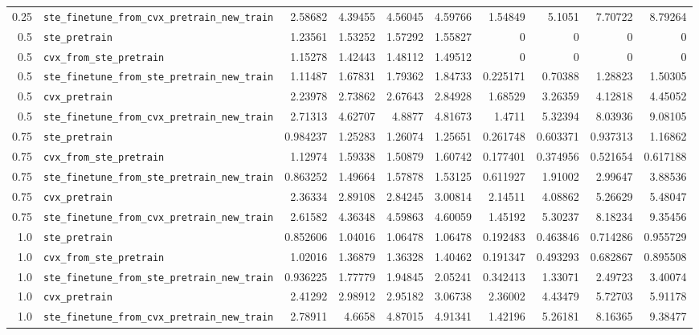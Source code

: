 \begin{longtable}{@{}r l *{8}{r}@{}}
0.25 & \texttt{ste\_finetune\_from\_cvx\_pretrain\_new\_train} & 2.58682 & 4.39455 & 4.56045 & 4.59766 & 1.54849 & 5.1051 & 7.70722 & 8.79264 \\
0.5 & \texttt{ste\_pretrain} & 1.23561 & 1.53252 & 1.57292 & 1.55827 & 0 & 0 & 0 & 0 \\
0.5 & \texttt{cvx\_from\_ste\_pretrain} & 1.15278 & 1.42443 & 1.48112 & 1.49512 & 0 & 0 & 0 & 0 \\
0.5 & \texttt{ste\_finetune\_from\_ste\_pretrain\_new\_train} & 1.11487 & 1.67831 & 1.79362 & 1.84733 & 0.225171 & 0.70388 & 1.28823 & 1.50305 \\
0.5 & \texttt{cvx\_pretrain} & 2.23978 & 2.73862 & 2.67643 & 2.84928 & 1.68529 & 3.26359 & 4.12818 & 4.45052 \\
0.5 & \texttt{ste\_finetune\_from\_cvx\_pretrain\_new\_train} & 2.71313 & 4.62707 & 4.8877 & 4.81673 & 1.4711 & 5.32394 & 8.03936 & 9.08105 \\
0.75 & \texttt{ste\_pretrain} & 0.984237 & 1.25283 & 1.26074 & 1.25651 & 0.261748 & 0.603371 & 0.937313 & 1.16862 \\
0.75 & \texttt{cvx\_from\_ste\_pretrain} & 1.12974 & 1.59338 & 1.50879 & 1.60742 & 0.177401 & 0.374956 & 0.521654 & 0.617188 \\
0.75 & \texttt{ste\_finetune\_from\_ste\_pretrain\_new\_train} & 0.863252 & 1.49664 & 1.57878 & 1.53125 & 0.611927 & 1.91002 & 2.99647 & 3.88536 \\
0.75 & \texttt{cvx\_pretrain} & 2.36334 & 2.89108 & 2.84245 & 3.00814 & 2.14511 & 4.08862 & 5.26629 & 5.48047 \\
0.75 & \texttt{ste\_finetune\_from\_cvx\_pretrain\_new\_train} & 2.61582 & 4.36348 & 4.59863 & 4.60059 & 1.45192 & 5.30237 & 8.18234 & 9.35456 \\
1.0 & \texttt{ste\_pretrain} & 0.852606 & 1.04016 & 1.06478 & 1.06478 & 0.192483 & 0.463846 & 0.714286 & 0.955729 \\
1.0 & \texttt{cvx\_from\_ste\_pretrain} & 1.02016 & 1.36879 & 1.36328 & 1.40462 & 0.191347 & 0.493293 & 0.682867 & 0.895508 \\
1.0 & \texttt{ste\_finetune\_from\_ste\_pretrain\_new\_train} & 0.936225 & 1.77779 & 1.94845 & 2.05241 & 0.342413 & 1.33071 & 2.49723 & 3.40074 \\
1.0 & \texttt{cvx\_pretrain} & 2.41292 & 2.98912 & 2.95182 & 3.06738 & 2.36002 & 4.43479 & 5.72703 & 5.91178 \\
1.0 & \texttt{ste\_finetune\_from\_cvx\_pretrain\_new\_train} & 2.78911 & 4.6658 & 4.87015 & 4.91341 & 1.42196 & 5.26181 & 8.16365 & 9.38477 \\

\end{longtable}
